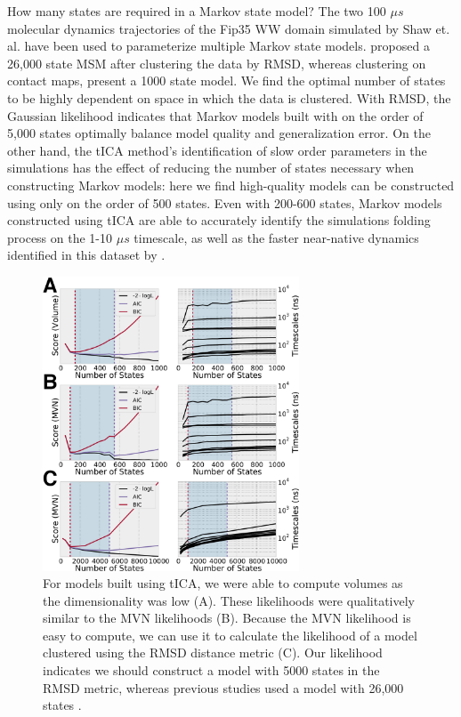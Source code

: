 \documentclass[twocolumn,floatfix,nofootinbib,aps]{revtex4-1}
\begin{document}
How many states are required in a Markov state model? The two 100 $\mu s$ molecular dynamics trajectories of the Fip35 WW domain simulated by Shaw et. al.\cite{Shaw2010Atomic} have been used to parameterize multiple Markov state models. \citet{Lane2011Markov} proposed a 26,000 state MSM after clustering the data by RMSD, whereas \citet{Kellogg2012Evaluation} clustering on contact maps, present a 1000 state model. We find the optimal number of states to be highly dependent on space in which the data is clustered. With RMSD, the Gaussian likelihood indicates that Markov models built with on the order of 5,000 states optimally balance model quality and generalization error. On the other hand, the tICA method's identification of slow order parameters in the simulations has the effect of reducing the number of states necessary when constructing Markov models: here we find high-quality models can be constructed using only on the order of 500 states. Even with 200-600 states, Markov models constructed using tICA are able to accurately identify the simulations folding process on the 1-10 $\mu s$ timescale, as well as the faster near-native dynamics identified in this dataset by \citet{McGibbon2013Learning}.

\begin{figure}
\centering
\includegraphics[width=3in]{figs/ww_logLs.png}
\caption{For models built using tICA, we were able to compute volumes as the dimensionality was low (A). These likelihoods were qualitatively similar to the MVN likelihoods (B). Because the MVN likelihood is easy to compute, we can use it to calculate the likelihood of a model clustered using the RMSD distance metric (C). Our likelihood indicates we should construct a model with 5000 states in the RMSD metric, whereas previous studies used a model with 26,000 states \cite{Lane2011Markov}.}
\label{fig:ww}
\end{figure}
\end{document}
